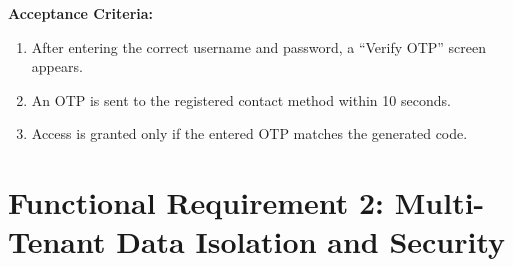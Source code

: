 \noindent\textbf{Acceptance Criteria:}
\begin{enumerate}
    \item After entering the correct username and password, a ``Verify OTP'' screen appears.
    \item An OTP is sent to the registered contact method within 10 seconds.
    \item Access is granted only if the entered OTP matches the generated code.
\end{enumerate}


\section{Functional Requirement 2: Multi-Tenant Data Isolation and Security}

